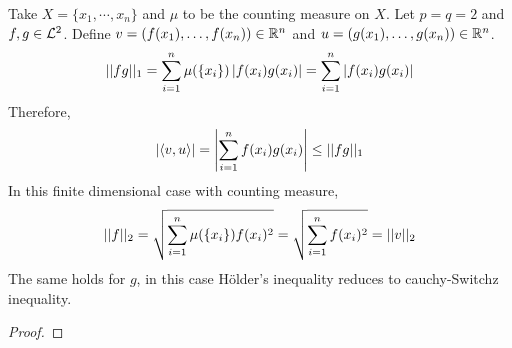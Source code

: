 \documentclass[11pt]{article}
\begin{document}
	\begin{example}
		Take $X = \{x_1,\cdots, x_n\}$ and $\mu$ to be the counting measure on $X$. Let $p = q = 2$ and $f, g \in \mathcal{{L}}^2$. Define $v = (f(x_1), \dots, f(x_n)) \in \mathbb{R}^n$ and $u = (g(x_1),\dots,g(x_n)) \in \mathbb{R}^n$.
		\begin{align}
			\vert \vert {fg} \vert \vert_1 = \sum_{i=1}^n \mu(\{x_i\}) \left \vert {f(x_i) g(x_i)} \right \vert = \sum_{i=1}^n \left \vert {f(x_i) g(x_i)} \right \vert
		\end{align}
		Therefore,
		\begin{align}
			\left \vert {\langle {v}, {u} \rangle} \right \vert = \left \vert {\sum_{i=1}^n f(x_i) g(x_i)} \right \vert \leq \vert \vert {fg} \vert \vert_1
		\end{align}
		In this finite dimensional case with counting measure,
		\begin{align}
			\vert \vert {f} \vert \vert_2 = \sqrt{\sum_{i=1}^n \mu(\{x_i\}) f(x_i)^2} = \sqrt{\sum_{i=1}^n f(x_i)^2} = \vert \vert {v} \vert \vert_2
		\end{align}
		The same holds for $g$, in this case H\"older's inequality reduces to cauchy-Switchz inequality.
	\end{example}
	
	\begin{proof}
		
	\end{proof}
	
\end{document}
